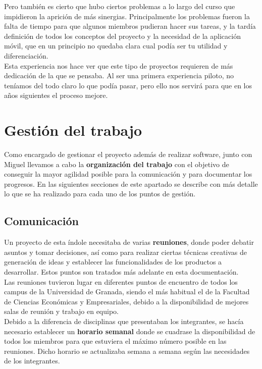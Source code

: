 Pero también es cierto que hubo ciertos problemas a lo largo del curso que impidieron la aprición de más sinergias. Principalmente los problemas fueron la falta de tiempo para que algunos miembros pudieran hacer sus tareas, y la tardía definición de todos los conceptos del proyecto y la necesidad de la aplicación móvil, que en un principio no quedaba clara cual podía ser tu utilidad y diferenciación.\\

Esta experiencia nos hace ver que este tipo de proyectos requieren de más dedicación de la que se pensaba. Al ser una primera experiencia piloto, no teníamos del todo claro lo que podía pasar, pero ello nos servirá para que en los años siguientes el proceso mejore.

\section{Gestión del trabajo}
Como encargado de gestionar el proyecto además de realizar software, junto con Miguel llevamos a cabo la \textbf{organización del trabajo} con el objetivo de conseguir la mayor agilidad posible para la comunicación y para documentar los progresos. En las siguientes secciones de este apartado se describe con más detalle lo que se ha realizado para cada uno de los puntos de gestión.

\subsection{Comunicación}
Un proyecto de esta índole necesitaba de varias \textbf{reuniones}, donde poder debatir asuntos y tomar decisiones, así como para realizar ciertas técnicas creativas de generación de ideas y establecer las funcionalidades de los productos a desarrollar. Estos puntos son tratados más adelante en esta documentación.\\

Las reuniones tuvieron lugar en diferentes puntos de encuentro de todos los campus de la Universidad de Granada, siendo el más habitual el de la Facultad de Ciencias Económicas y Empresariales, debido a la disponibilidad de mejores salas de reunión y trabajo en equipo.\\

Debido a la diferencia de disciplinas que presentaban los integrantes, se hacía necesario establecer un \textbf{horario semanal} donde se cuadrase la disponibilidad de todos los miembros para que estuviera el máximo número posible en las reuniones. Dicho horario se actualizaba semana a semana según las necesidades de los integrantes.

